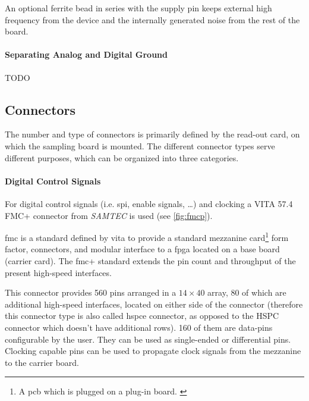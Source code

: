 An optional ferrite bead in series with the supply pin keeps external high frequency from the device and the internally generated noise from the rest of the board. \cite{decouple}

\paragraph{Separating Analog and Digital Ground}
TODO



\subsection{Connectors}\label{sec:connectors}
The number and type of connectors is primarily defined by the read-out card, on which the sampling board is mounted.
The different connector types serve different purposes, which can be organized into three categories.

\paragraph{Digital Control Signals}
For digital control signals (i.e. \gls{spi}, enable signals, \ldots) and clocking a VITA 57.4 FMC+ connector from \textit{SAMTEC} is used (see \autoref{fig:fmcp}). 

\gls{fmc} is a standard defined by \gls{vita} to provide a standard mezzanine card\footnote{A \gls{pcb} which is plugged on a plug-in board. \cite{mezzanine}} form factor, connectors, and modular interface to a \gls{fpga} located on a base board (carrier card). \cite{Seelam2009}
The \gls{fmc}+ standard extends the pin count and throughput of the present high-speed interfaces. 

This connector provides 560 pins arranged in a $14\times40$ array, 80 of which are additional high-speed interfaces, located on either side of the connector (therefore this connector type is also called \gls{hspce} connector, as opposed to the HSPC connector which doesn't have additional rows).
160 of them are data-pins configurable by the user. %
They can be used as single-ended or differential pins.
Clocking capable pins can be used to propagate clock signals from the mezzanine to the carrier board. 

